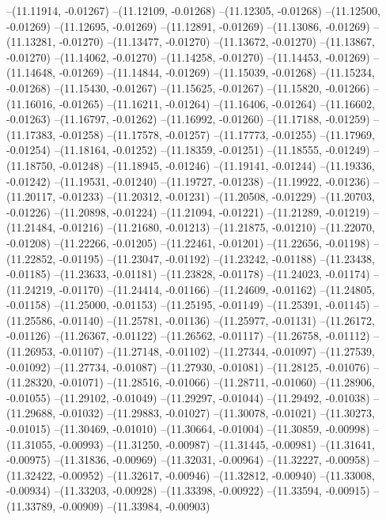 --(11.11914, -0.01267)
--(11.12109, -0.01268)
--(11.12305, -0.01268)
--(11.12500, -0.01269)
--(11.12695, -0.01269)
--(11.12891, -0.01269)
--(11.13086, -0.01269)
--(11.13281, -0.01270)
--(11.13477, -0.01270)
--(11.13672, -0.01270)
--(11.13867, -0.01270)
--(11.14062, -0.01270)
--(11.14258, -0.01270)
--(11.14453, -0.01269)
--(11.14648, -0.01269)
--(11.14844, -0.01269)
--(11.15039, -0.01268)
--(11.15234, -0.01268)
--(11.15430, -0.01267)
--(11.15625, -0.01267)
--(11.15820, -0.01266)
--(11.16016, -0.01265)
--(11.16211, -0.01264)
--(11.16406, -0.01264)
--(11.16602, -0.01263)
--(11.16797, -0.01262)
--(11.16992, -0.01260)
--(11.17188, -0.01259)
--(11.17383, -0.01258)
--(11.17578, -0.01257)
--(11.17773, -0.01255)
--(11.17969, -0.01254)
--(11.18164, -0.01252)
--(11.18359, -0.01251)
--(11.18555, -0.01249)
--(11.18750, -0.01248)
--(11.18945, -0.01246)
--(11.19141, -0.01244)
--(11.19336, -0.01242)
--(11.19531, -0.01240)
--(11.19727, -0.01238)
--(11.19922, -0.01236)
--(11.20117, -0.01233)
--(11.20312, -0.01231)
--(11.20508, -0.01229)
--(11.20703, -0.01226)
--(11.20898, -0.01224)
--(11.21094, -0.01221)
--(11.21289, -0.01219)
--(11.21484, -0.01216)
--(11.21680, -0.01213)
--(11.21875, -0.01210)
--(11.22070, -0.01208)
--(11.22266, -0.01205)
--(11.22461, -0.01201)
--(11.22656, -0.01198)
--(11.22852, -0.01195)
--(11.23047, -0.01192)
--(11.23242, -0.01188)
--(11.23438, -0.01185)
--(11.23633, -0.01181)
--(11.23828, -0.01178)
--(11.24023, -0.01174)
--(11.24219, -0.01170)
--(11.24414, -0.01166)
--(11.24609, -0.01162)
--(11.24805, -0.01158)
--(11.25000, -0.01153)
--(11.25195, -0.01149)
--(11.25391, -0.01145)
--(11.25586, -0.01140)
--(11.25781, -0.01136)
--(11.25977, -0.01131)
--(11.26172, -0.01126)
--(11.26367, -0.01122)
--(11.26562, -0.01117)
--(11.26758, -0.01112)
--(11.26953, -0.01107)
--(11.27148, -0.01102)
--(11.27344, -0.01097)
--(11.27539, -0.01092)
--(11.27734, -0.01087)
--(11.27930, -0.01081)
--(11.28125, -0.01076)
--(11.28320, -0.01071)
--(11.28516, -0.01066)
--(11.28711, -0.01060)
--(11.28906, -0.01055)
--(11.29102, -0.01049)
--(11.29297, -0.01044)
--(11.29492, -0.01038)
--(11.29688, -0.01032)
--(11.29883, -0.01027)
--(11.30078, -0.01021)
--(11.30273, -0.01015)
--(11.30469, -0.01010)
--(11.30664, -0.01004)
--(11.30859, -0.00998)
--(11.31055, -0.00993)
--(11.31250, -0.00987)
--(11.31445, -0.00981)
--(11.31641, -0.00975)
--(11.31836, -0.00969)
--(11.32031, -0.00964)
--(11.32227, -0.00958)
--(11.32422, -0.00952)
--(11.32617, -0.00946)
--(11.32812, -0.00940)
--(11.33008, -0.00934)
--(11.33203, -0.00928)
--(11.33398, -0.00922)
--(11.33594, -0.00915)
--(11.33789, -0.00909)
--(11.33984, -0.00903)
